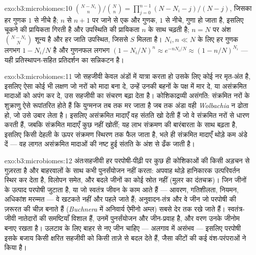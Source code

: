 \begin{solution}{exo:b3:microbiomes:10}
$\binom{N-N_{i}}{n}/\binom{N}{n} = \prod_{j=0}^{n-1}(N - N_{i} - j)/(N -
j)$, जिसका हर गुणक $1$ से नीचे है; $n$ से $n + 1$ पर जाने से एक और
गुणक, $1$ से नीचे, गुणा हो जाता है, इसलिए चूकने की प्रायिकता गिरती है
और उपस्थिति की प्रायिकता $n$ के साथ चढ़ती है; $n = N$ पर अंश $\binom{N -
N_{i}}{N}$ शून्य है और हर जाति उपस्थित, जिससे $S$ मिलता है। $N_{i},
n \ll N$ के लिए हर गुणक लगभग $1 - N_{i}/N$ है और गुणनफल लगभग $(1 -
N_{i}/N)^{n} \approx e^{-nN_{i}/N} \approx (1 - n/N)^{N_{i}}$ --- यही
प्रतिस्थापन-सहित प्रतिदर्शन का सन्निकटन है।
\end{solution}

\begin{solution}{exo:b3:microbiomes:11}
जो सहजीवी केवल अंडों में यात्रा करता हो उसके लिए कोई नर मृत-अंत है,
इसलिए ऐसा कोई भी लक्षण जो नरों को मादा बना दे, उन्हें उनकी बहनों के
पक्ष में मार दे, या असंक्रमित मादाओं को अपंग कर दे, उस सहजीवी का संचरण
बढ़ा देता है। कोशिकाद्रव्यी असंगति: संक्रमित नरों के शुक्राणु ऐसे
रूपांतरित होते हैं कि युग्मनज तब तक मर जाता है जब तक अंडा वही
\emph{Wolbachia} न ढोता हो, जो उसे उबार लेता है। इसलिए असंक्रमित
मादाएँ वह संतति खो देती हैं जो वे संक्रमित नरों से धारण करती हैं, जबकि
संक्रमित मादाएँ कुछ नहीं खोतीं; यह लाभ संक्रमण की बारंबारता के साथ
बढ़ता है, इसलिए किसी देहली के ऊपर संक्रमण स्थिरण तक फैल जाता है, भले ही
संक्रमित मादाएँ थोड़े कम अंडे दें --- वह लागत असंक्रमित मादाओं की नष्ट
हुई संतति के अंश से ढँक जाती है।
\end{solution}

\begin{solution}{exo:b3:microbiomes:12}
अंतःसहजीवी हर परपोषी-पीढ़ी पर कुछ ही कोशिकाओं की किसी अड़चन से गुज़रता
है और बाहरवालों के साथ कभी पुनर्संयोजन नहीं करता: अपवाह थोड़े हानिकारक
उत्परिवर्तन स्थिर कर देता है, विलोपन समेत, और बदले जीनों का कोई स्रोत
नहीं (मुलर का दंतचक्र)। जिन जीनों के उत्पाद परपोषी जुटाता है, या जो
स्वतंत्र जीवन के काम आते हैं --- आवरण, गतिशीलता, नियमन, अधिकांश मरम्मत
--- वे खटकते नहीं और पहले जाते हैं; अनुवादन-तंत्र और वे जीन जो परपोषी
की ज़रूरत की चीज़ बनाते हैं (\emph{Buchnera} में अनिवार्य ऐमीनो अम्ल)
सबसे देर तक रखे जाते हैं। स्वतंत्र-जीवी नातेदारों की समष्टियाँ विशाल
हैं, उनमें पुनर्संयोजन और जीन-प्रवाह है, और वरण उनके जीनोम बनाए रखता
है। उलटाव के लिए बाहर से नए जीन चाहिए --- अलगाव में असंभव --- इसलिए
परपोषी इसके बजाय किसी क्षरित सहजीवी को किसी ताज़े से बदल देते हैं, जैसा
कीटों की कई वंश-परंपराओं ने किया है।
\end{solution}

